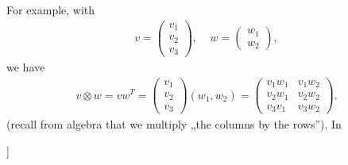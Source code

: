 \documentclass[a4paper,12pt,polish]{jupyterBook}
\begin{document}
\sphinxAtStartPar
For example, with
\begin{equation*}
\begin{split} v = \left ( \begin{array}{c} v_1 \\ v_2 \\v_3 \end{array}  \right ), \;\;\;\; w = \left ( \begin{array}{c} w_1 \\ w_2 \end{array}  \right ), \end{split}
\end{equation*}
\sphinxAtStartPar
we have
\begin{equation*}
\begin{split} 
v \otimes w = v w^T=
\left ( \begin{array}{c} v_1 \\ v_2 \\v_3 \end{array}  \right ) (w_1,w_2)
= \left ( \begin{array}{cc} v_1 w_1 & v_1 w_2 \\ v_2 w_1 & v_2 w_2 \\v_3 v_1 & v_3 w_2 \end{array}  \right ).
\end{split}
\end{equation*}
\sphinxAtStartPar
(recall from algebra that we multiply „the columns by the rows”). In 
\begin{sphinxVerbatimInput}

\begin{sphinxVerbatim}[commandchars=\\\{\}]
\PYG{p}{[}\PYG{p}{]}\PYG{p}{[}\PYG{p}{]} 
\end{sphinxVerbatim}
\end{sphinxVerbatimInput}
\begin{sphinxVerbatimOutput}

\begin{sphinxVerbatim}[commandchars=\\\{\}]
[[ 2  7]
 [ 4 14]
 [ 6 21]]
\end{sphinxVerbatim}
\end{sphinxVerbatimOutput}
\end{document}
